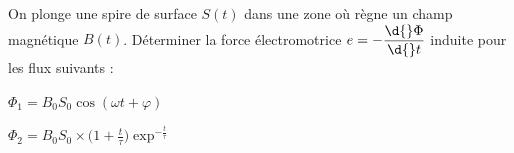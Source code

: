 \finEntrainement







\hauteurLargeurCadreReponse		{9mm}{5cm}
\typeEntrainement				{} %
\initialisationEntrainement


On plonge une spire de surface $S(t)$ dans une zone où règne un champ magnétique $B(t)$. 
Déterminer la force électromotrice $e=-\dfrac{\d{}\Phi}{\d{}t}$ induite pour les flux suivants :

\debutEntrainement



\begin{enonce}
$\Phi_{1}=B_{0}S_{0}\cos\left(\omega t+\varphi\right)$
\end{enonce}

%




\begin{enonce}
$\Phi_{2}=B_{0}S_{0}\times \Big(1+\frac{t}{\tau}\Big)\exp^{-\frac{t}{\tau}}$
\end{enonce}

%


